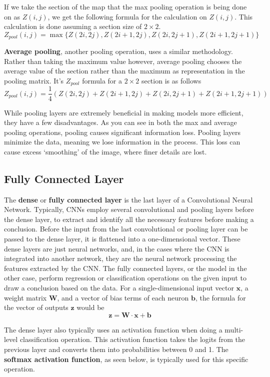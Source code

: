 \begin{flushleft}
        If we take the section of the map that the max pooling operation is being done on as $Z(i, j)$, we get the following formula for the calculation on $Z(i, j)$. This calculation is done assuming a section size of $2 \times 2$.
        $$Z_{pool}(i, j) = \max \{Z(2i,2j), Z(2i+1,2j), Z(2i,2j+1), Z(2i+1,2j+1)\}$$ 

        \textbf{Average pooling}, another pooling operation, uses a similar methodology. Rather than taking the maximum value however, average pooling chooses the average value of the section rather than the maximum as representation in the pooling matrix. It's $Z_{pool}$ formula for a $2 \times 2$ section is as follows
        $$Z_{pool}(i, j) = \frac{1}{4} (Z(2i,2j) + Z(2i+1,2j) + Z(2i,2j+1) + Z(2i+1,2j+1))$$

        While pooling layers are extremely beneficial in making models more efficient, they have a few disadvantages. As you can see in both the max and average pooling operations, pooling causes significant information loss. Pooling layers minimize the data, meaning we lose information in the process. This loss can cause excess `smoothing' of the image, where finer details are lost.

        \subsection{Fully Connected Layer}
        The \textbf{dense} or \textbf{fully connected layer} is the last layer of a Convolutional Neural Network. Typically, CNNs employ several convolutional and pooling layers before the dense layer, to extract and identify all the necessary features before making a conclusion. Before the input from the last convolutional or pooling layer can be passed to the dense layer, it is flattened into a one-dimensional vector. These dense layers are just neural networks, and, in the cases where the CNN is integrated into another network, they are the neural network processing the features extracted by the CNN. The fully connected layers, or the model in the other case, perform regression or classification operations on the given input to draw a conclusion based on the data. For a single-dimensional input vector $\textbf{x}$, a weight matrix $\textbf{W}$, and a vector of bias terms of each neuron $\textbf{b}$, the formula for the vector of outputs $\textbf{z}$ would be
        $$\textbf{z} = \textbf{W} \cdot \textbf{x} + \textbf{b}$$

        The dense layer also typically uses an activation function when doing a multi-level classification operation. This activation function takes the logits from the previous layer and converts them into probabilities between 0 and 1. The \textbf{softmax activation function}, as seen below, is typically used for this specific operation. 
        

\end{flushleft}
